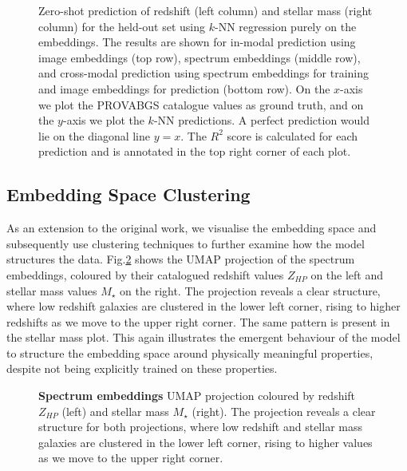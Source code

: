 \documentclass[draft, a4paper,12pt]{article}
\begin{document}
\begin{figure}[H]
    \caption{Zero-shot prediction of redshift (left column) and stellar mass (right column) for the held-out set using $k$-NN regression purely on the embeddings. The results are shown for in-modal prediction using image embeddings (top row), spectrum embeddings (middle row), and cross-modal prediction using spectrum embeddings for training and image embeddings for prediction (bottom row). On the $x$-axis we plot the PROVABGS catalogue values as ground truth, and on the $y$-axis we plot the $k$-NN predictions. A perfect prediction would lie on the diagonal line $ y = x $. The $R^2$ score is calculated for each prediction and is annotated in the top right corner of each plot.}
    \label{fig:zeroshot}
\end{figure}



\subsection{Embedding Space Clustering}
As an extension to the original work, we visualise the embedding space and subsequently use clustering techniques to further examine how the model structures the data. Fig.\ref{fig:umap_of_spectra} shows the UMAP projection of the spectrum embeddings, coloured by their catalogued redshift values $Z_{HP}$ on the left and stellar mass values $M_{\star}$ on the right. The projection reveals a clear structure, where low redshift galaxies are clustered in the lower left corner, rising to higher redshifts as we move to the upper right corner. The same pattern is present in the stellar mass plot. This again illustrates the emergent behaviour of the model to structure the embedding space around physically meaningful properties, despite not being explicitly trained on these properties. 


\begin{figure}[H]
    \centering
    \caption{\textbf{Spectrum embeddings} UMAP projection coloured by redshift $Z_{HP}$ (left) and stellar mass $M_{\star}$ (right). The projection reveals a clear structure for both projections, where low redshift and stellar mass galaxies are clustered in the lower left corner, rising to higher values as we move to the upper right corner.}
    \label{fig:umap_of_spectra}
\end{figure}
\end{document}
